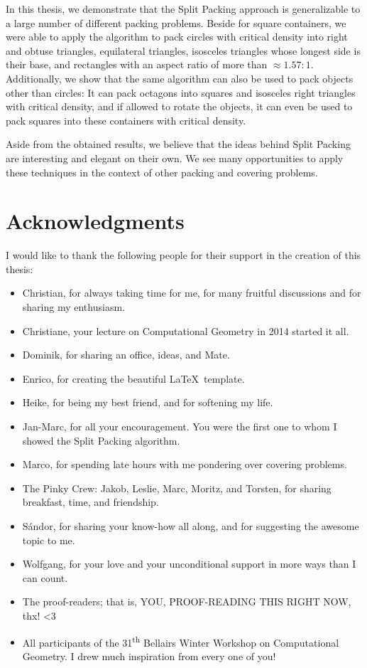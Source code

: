 \documentclass[a4paper,style=print,bibliography=totoc,nexus,lnum,extramargin]{tubsbook}
\begin{document}
In this thesis, we demonstrate that the Split Packing approach is generalizable to a large number of different packing problems.
Beside for square containers, we were able to apply the algorithm to pack circles with critical density into
right and obtuse triangles,
equilateral triangles,
isosceles triangles whose longest side is their base,
and rectangles with an aspect ratio of more than $\approx \! 1.57:1$.
Additionally, we show that the same algorithm can also be used to pack objects other than circles: It can pack octagons into squares and isosceles right triangles with critical density, and if allowed to rotate the objects, it can even be used to pack squares into these containers with critical density.

Aside from the obtained results, we believe that the ideas behind Split Packing are interesting and elegant on their own. We see many opportunities to apply these techniques in the context of other packing and covering problems.

\cleardoublepage

\section*{Acknowledgments}

I would like to thank the following people for their support in the creation of this thesis:

\begin{itemize}
    \item Christian, for always taking time for me, for many fruitful discussions and for sharing my enthusiasm.
    \item Christiane, your lecture on Computational Geometry in 2014 started it all.
    \item Dominik, for sharing an office, ideas, and Mate.
    \item Enrico, for creating the beautiful \LaTeX\ template.
    \item Heike, for being my best friend, and for softening my life.
    \item Jan-Marc, for all your encouragement. You were the first one to whom I showed the Split Packing algorithm.
    \item Marco, for spending late hours with me pondering over covering problems.
    \item The Pinky Crew: Jakob, Leslie, Marc, Moritz, and Torsten, for sharing breakfast, time, and friendship.
    \item Sándor, for sharing your know-how all along, and for suggesting the awesome topic to me.
    \item Wolfgang, for your love and your unconditional support in more ways than I can count.
    \item The proof-readers; that is, YOU, PROOF-READING THIS RIGHT NOW, thx! <3
    \item All participants of the 31\textsuperscript{th} Bellairs Winter Workshop on Computational Geometry. I drew much inspiration from every one of you!
\end{itemize}
\end{document}
